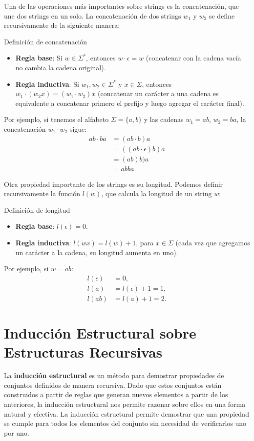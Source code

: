 Una de las operaciones más importantes sobre strings es la concatenación, que une dos strings en un solo. La concatenación de dos strings $w_1$ y $w_2$ se define recursivamente de la siguiente manera:
\begin{exampleblock}{Definición de concatenación}
\begin{itemize}
    \item \textbf{Regla base}: Si $w \in \Sigma^*$, entonces $w \cdot \epsilon = w$ (concatenar con la cadena vacía no cambia la cadena original).
    \item \textbf{Regla inductiva}: Si $w_1, w_2 \in \Sigma^*$ y $x \in \Sigma$, entonces $w_1 \cdot (w_2x) = (w_1 \cdot w_2) x$ (concatenar un carácter a una cadena es equivalente a concatenar primero el prefijo y luego agregar el carácter final).
\end{itemize}
\end{exampleblock}

Por ejemplo, si tenemos el alfabeto $\Sigma = \{a, b\}$ y las cadenas $w_1 = ab$, $w_2 = ba$, la concatenación $w_1 \cdot w_2$ sigue:
\begin{align*}
    ab \cdot ba &= (ab \cdot b)a \\
    &= ((ab \cdot \epsilon)b)a \\
    &= (ab)b)a \\
    &= abb a.
\end{align*}

Otra propiedad importante de los strings es su longitud. Podemos definir recursivamente la función $l(w)$, que calcula la longitud de un string $w$:
\begin{exampleblock}{Definición de longitud}
\begin{itemize}
    \item \textbf{Regla base}: $l(\epsilon) = 0$.
    \item \textbf{Regla inductiva}: $l(w x) = l(w) + 1$, para $x \in \Sigma$ (cada vez que agregamos un carácter a la cadena, su longitud aumenta en uno).
\end{itemize}
\end{exampleblock}

Por ejemplo, si $w = ab$:
\begin{align*}
    l(\epsilon) &= 0, \\
    l(a) &= l(\epsilon) + 1 = 1, \\
    l(ab) &= l(a) + 1 = 2.
\end{align*}

\section{Inducción Estructural sobre Estructuras Recursivas}
La \textbf{inducción estructural} es un método para demostrar propiedades de conjuntos definidos de manera recursiva. Dado que estos conjuntos están construidos a partir de reglas que generan nuevos elementos a partir de los anteriores, la inducción estructural nos permite razonar sobre ellos en una forma natural y efectiva.
La inducción estructural permite demostrar que una propiedad se cumple para todos los elementos del conjunto sin necesidad de verificarlos uno por uno.

